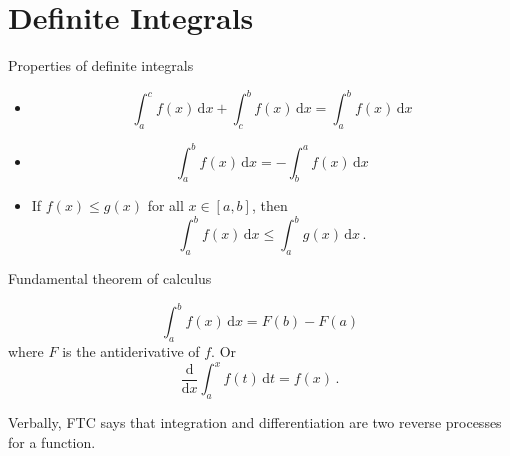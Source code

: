 \section[DefInt]{Definite Integrals}
\begin{frame}{Properties of definite integrals}

\begin{itemize}
\item 
\[
\int_{a}^{c}f\left(x\right)\,\mathrm{d}x+\int_{c}^{b}f\left(x\right)\,\mathrm{d}x=\int_{a}^{b}f\left(x\right)\,\mathrm{d}x
\]

\end{itemize}

\pause{}
\begin{itemize}
\item 
\[
\int_{a}^{b}f\left(x\right)\,\mathrm{d}x=-\int_{b}^{a}f\left(x\right)\,\mathrm{d}x
\]

\end{itemize}

\pause{}
\begin{itemize}
\item If $f\left(x\right)\le g\left(x\right)$ for all $x\in\left[a,b\right]$,
then
\[
\int_{a}^{b}f\left(x\right)\,\mathrm{d}x\le\int_{a}^{b}g\left(x\right)\,\mathrm{d}x\,.
\]

\end{itemize}
\end{frame}

\begin{frame}{Fundamental theorem of calculus}


\[
\int_{a}^{b}f\left(x\right)\,\mathrm{d}x=F\left(b\right)-F\left(a\right)
\]
where $F$ is the antiderivative of $f$. Or
\[
\frac{\mathrm{d}}{\mathrm{d}x}\int_{a}^{x}f\left(t\right)\,\mathrm{d}t=f\left(x\right)\,.
\]



\pause{}


Verbally, FTC says that integration and differentiation are two reverse
processes for a function.

\end{frame}

